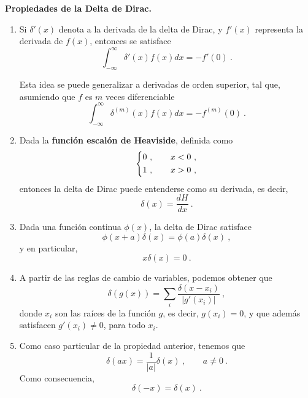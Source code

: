 \begin{propiedad}
    \textbf{Propiedades de la Delta de Dirac.}
    \begin{enumerate}
        \item Si $\delta'(x)$ denota a la derivada de la delta de Dirac, y $f'(x)$ representa la derivada de $f(x)$, entonces se satisface
        \begin{equation}
            \int_{-\infty}^{\infty} \delta'(x) f(x) dx = - f'(0) \ .
        \end{equation}

        Esta idea se puede generalizar a derivadas de orden superior, tal que, asumiendo que $f$ es $m$ veces diferenciable
        \begin{equation}
            \int_{-\infty}^{\infty} \delta^{(m)}(x) f(x) dx = - f^{(m)}(0) \ .
        \end{equation}

        \item Dada la \textbf{función escalón de Heaviside}, definida como
        \begin{equation}
            \begin{dcases}
                0 \ , \qquad x < 0 \ , \\
                1 \ , \qquad x > 0 \ ,
            \end{dcases}
        \end{equation}
        entonces la delta de Dirac puede entenderse como su derivada, es decir,
        \begin{equation}
            \delta(x) = \frac{dH}{dx} \ .
        \end{equation}
        
        \item Dada una función continua $\phi(x)$, la delta de Dirac satisface
        \begin{equation}
            \phi(x+a) \delta(x) = \phi(a) \delta(x) \ ,
        \end{equation}
        y en particular,
        \begin{equation}
            x \delta(x) = 0 \ .
        \end{equation}
        \item A partir de las reglas de cambio de variables, podemos obtener que
        \begin{equation}
            \delta(g(x)) = \sum_i \frac{\delta(x-x_i)}{|g'(x_i)|} \ ,
        \end{equation}
        donde $x_i$ son las raíces de la función $g$, es decir, $g(x_i) = 0$, y que además satisfacen $g'(x_i) \neq 0$, para todo $x_i$.
        \item Como caso particular de la propiedad anterior, tenemos que
        \begin{equation}
            \delta(ax) = \frac{1}{|a|}\delta(x) \ , \qquad a \neq 0 \ .
        \end{equation}
        Como consecuencia,
        \begin{equation}
            \delta(-x) = \delta(x) \ .
        \end{equation}
    \end{enumerate}
\end{propiedad}

